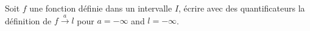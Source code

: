 Soit $f$ une fonction d\'efinie dans un intervalle $I$, \'ecrire avec des quantificateurs la d\'efinition de
$f\stackrel{a}{\rightarrow}l$ pour $a= -\infty$ and $l=-\infty$.\bigskip